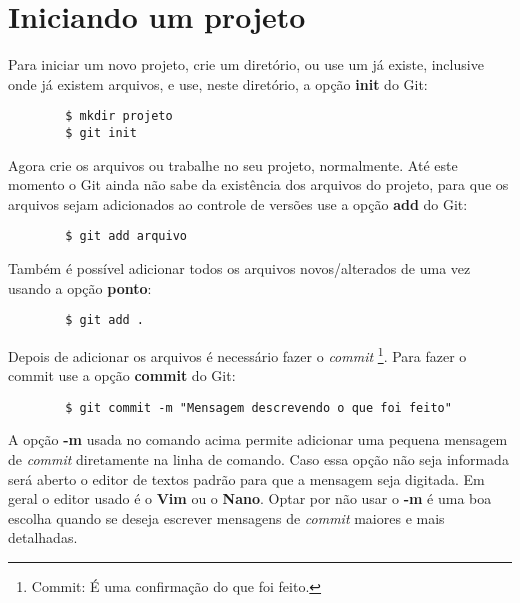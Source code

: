 \documentclass[12pt,a4paper]{report}
\begin{document}
\chapter{Iniciando um projeto}
    Para iniciar um novo projeto, crie um diretório, ou use um já existe,
    inclusive onde já existem arquivos, e use, neste diretório, a opção
    \textbf{init} do Git:
    \begin{lstlisting}
        $ mkdir projeto
        $ git init
    \end{lstlisting}
    Agora crie os arquivos ou trabalhe no seu projeto, normalmente. Até este
    momento o Git ainda não sabe da existência dos arquivos do projeto, para
    que os arquivos sejam adicionados ao controle de versões use a opção
    \textbf{add} do Git:
    \begin{lstlisting}
        $ git add arquivo
    \end{lstlisting}
    Também é possível adicionar todos os arquivos novos/alterados de uma vez
    usando a opção \textbf{ponto}:
    \begin{lstlisting}
        $ git add .
    \end{lstlisting}
    Depois de adicionar os arquivos é necessário fazer o \textit{commit}%
    \footnote{Commit: É uma confirmação do que foi feito.}. %
    Para fazer o commit use a opção \textbf{commit} do Git:
    \begin{lstlisting}
        $ git commit -m "Mensagem descrevendo o que foi feito"
    \end{lstlisting}
    A opção \textbf{-m} usada no comando acima permite adicionar uma pequena
    mensagem de \textit{commit} diretamente na linha de comando. Caso essa
    opção não seja informada será aberto o editor de textos padrão para que a
    mensagem seja digitada. Em geral o editor usado é o \textbf{Vim} ou o
    \textbf{Nano}. Optar por não usar o \textbf{-m} é uma boa escolha quando
    se deseja escrever mensagens de \textit{commit} maiores e mais detalhadas.
\end{document}
